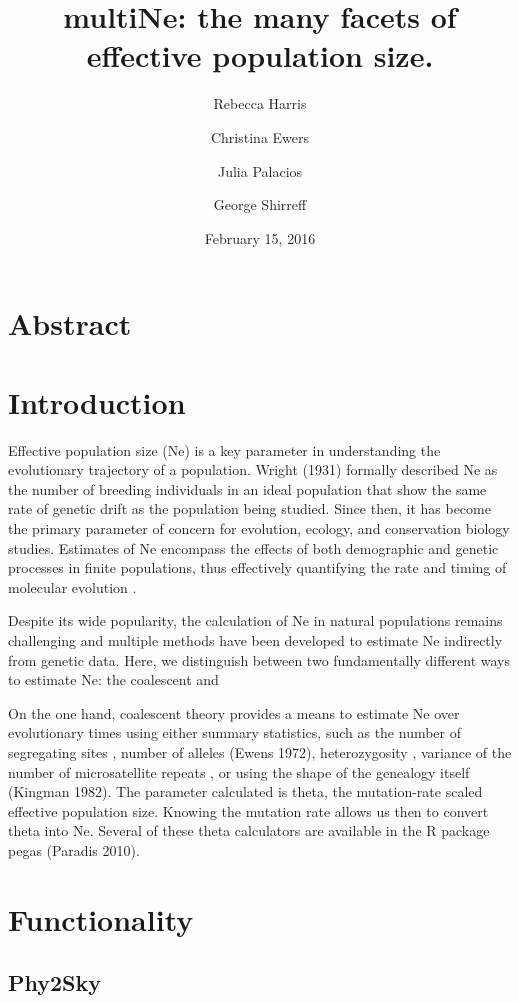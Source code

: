 \documentclass[12pt,a4paper,titlepage]{article}
\author[1]{Rebecca Harris}
\author[2]{Christina Ewers}
\author[3]{Julia Palacios}
\author[4]{George Shirreff}
\affil[2]{University of Georgia}
\affil[1]{Department of Biology, University of Washington}
\affil[3]{Harvard University}
\affil[4]{Imperial College London}
\date{February 15, 2016}
\title{multiNe: the many facets of effective population size.}
\begin{document}
\maketitle

\section{Abstract}
\section{Introduction}

Effective population size (Ne) is a key parameter in understanding the evolutionary trajectory of a population. Wright (1931) formally described Ne as the number of breeding individuals in an ideal population that show the same rate of genetic drift as the population being studied. Since then, it has become the primary parameter of concern for evolution, ecology, and conservation biology studies. Estimates of Ne encompass the effects of both demographic and genetic processes in finite populations, thus effectively quantifying the rate and timing of molecular evolution \citep{Caballero1994}. 

Despite its wide popularity, the calculation of Ne in natural populations remains challenging and multiple methods have been developed to estimate Ne indirectly from genetic data. Here, we distinguish between two fundamentally different ways to estimate Ne: the coalescent and 


On the one hand, coalescent theory provides a means to estimate Ne over evolutionary times using either summary statistics, such as the number of segregating sites \cite{Watterson1975}, number of alleles (Ewens 1972), heterozygosity \citep{Kimmel1998}, variance of the number of microsatellite repeats \citep{Kimmel1998}, or using the shape of the genealogy itself (Kingman 1982). The parameter calculated is theta, the mutation-rate scaled effective population size. Knowing the mutation rate allows us then to convert theta into Ne. Several of these theta calculators are available in the R package pegas (Paradis 2010). 

\section{Functionality}

\subsection{Phy2Sky}
\end{document}
